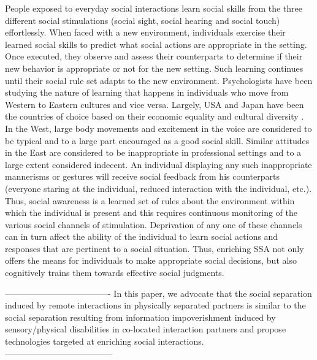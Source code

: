 \documentclass[oneside,11pt]{memoir}
\begin{document}
People exposed to everyday social interactions learn social skills from the three different social stimulations (social sight, social hearing and social touch) effortlessly. When faced with a new environment, individuals exercise their learned social skills to predict what social actions are appropriate in the setting. Once executed, they observe and assess their counterparts to determine if their new behavior is appropriate or not for the new setting. Such learning continues until their social rule set adapts to the new environment. Psychologists have been studying the nature of learning that happens in individuals who move from Western to Eastern cultures and vice versa. Largely, USA and Japan have been the countries of choice based on their economic equality and cultural diversity \cite{rogers_edward_2002}. In the West, large body movements and excitement in the voice are considered to be typical and to a large part encouraged as a good social skill. Similar attitudes in the East are considered to be inappropriate in professional settings and to a large extent considered indecent. An individual displaying any such inappropriate mannerisms or gestures will receive social feedback from his counterparts (everyone staring at the individual, reduced interaction with the individual, etc.).  Thus, social awareness is a learned set of rules about the environment within which the individual is present and this requires continuous monitoring of the various social channels of stimulation. Deprivation of any one of these channels can in turn affect the ability of the individual to learn social actions and responses that are pertinent to a social situation. Thus, enriching SSA not only offers the means for individuals to make appropriate social decisions, but also cognitively trains them towards effective social judgments.

-------------------------------------
In this paper, we advocate that the social separation induced by remote interactions in physically separated partners is similar to the social separation resulting from information impoverishment induced by sensory/physical disabilities in co-located interaction partners and propose technologies targeted at enriching social interactions.
--------------------------------------
\end{document}

